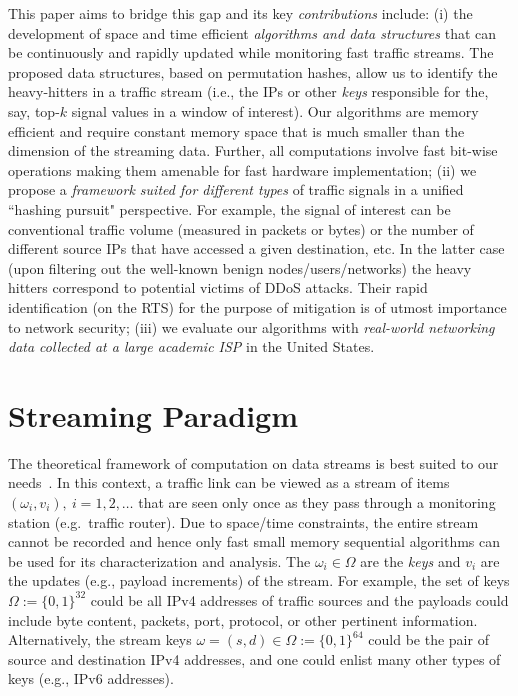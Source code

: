 \documentclass[10pt, conference, letterpaper,onecolumn]{IEEEtranv1.8}
\theoremstyle{plain}\newtheorem{thm}{Theorem}\newtheorem{lem}{Lemma}
\theoremstyle{definition}
\begin{document}
This paper aims to bridge this gap and its key {\em contributions} include:
(i) the  development of space and time efficient \emph{algorithms  and data structures} that can be continuously 
and rapidly updated while monitoring fast traffic streams. The proposed data structures, based on permutation hashes, allow us to identify the
heavy-hitters in a traffic stream (i.e., the IPs or other \emph{keys} responsible for the, say, top-$k$ signal values in a window of interest).
Our algorithms are
memory efficient and require constant memory space that is much smaller than the 
dimension of the streaming data. Further, all computations
involve fast bit-wise  operations making them amenable for fast hardware implementation;
(ii) we propose a \emph{framework  suited for different types} of traffic signals in a unified ``hashing pursuit" perspective. For example, the signal of interest can be 
conventional traffic volume (measured in packets or bytes) or the number of different source IPs  that have accessed a given destination, etc. In 
the latter case (upon filtering out the well-known benign nodes/users/networks) the heavy hitters correspond to potential victims of DDoS attacks. Their rapid
identification (on the RTS) for the purpose of mitigation is of utmost importance to network security; (iii) we evaluate our algorithms with
\emph{real-world networking data collected at a large academic ISP} in the United States.  
 
\section{Streaming Paradigm}
\label{sec:streaming}

The theoretical framework of computation on data streams is best suited to our needs~\cite{Muthukrishnan:2005:DSA:1166409.1166410}. In this context,
a traffic link can be viewed as a stream of items $(\omega_i,v_i),\ i=1,2,\ldots$ that are seen only once
as they pass through a monitoring station (e.g.\ traffic router). Due to space/time constraints, the 
entire stream cannot be recorded and hence only fast small memory sequential algorithms can be used 
for its characterization and analysis. The $\omega_i\in \Omega$ are the {\em keys} and $v_i$ are the updates 
(e.g., payload increments) of the stream. For example, the set of keys $\Omega := \{0,1\}^{32}$ could be all IPv4 addresses of
traffic sources and the payloads could include byte content, packets, port, protocol,
or other pertinent information. Alternatively, the stream keys $\omega = (s,d)\in \Omega := \{0,1\}^{64}$ could be the pair of
source and destination IPv4 addresses, and one could enlist many other types of keys (e.g., IPv6 addresses). 
\end{document}
